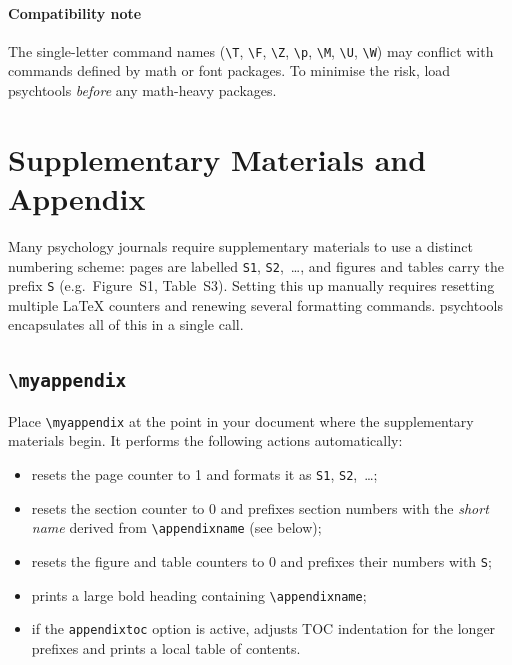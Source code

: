 \documentclass[a4paper,11pt]{article}
\makeatletter
\newcommand{\pkg}[1]{\textsf{#1}}
\newcommand{\cmd}[1]{\texttt{\textbackslash #1}}
\newcommand{\opt}[1]{\texttt{#1}}
\newcommand{\icmd}[1]{\cmd{#1}\index{#1@\texttt{\textbackslash #1}}}
\makeatother
\begin{document}
\paragraph{Compatibility note}
\label{sec:compat}
The single-letter command names (\cmd{T}, \cmd{F}, \cmd{Z}, \cmd{p},
\cmd{M}, \cmd{U}, \cmd{W}) may conflict with commands defined by math
or font packages.  To minimise the risk, load \pkg{psychtools}
\emph{before} any math-heavy packages.

\section{Supplementary Materials and Appendix}
\label{sec:appendix}

Many psychology journals require supplementary materials to use a
distinct numbering scheme: pages are labelled \texttt{S1},
\texttt{S2},~\ldots, and figures and tables carry the prefix
\texttt{S} (e.g.\ Figure~S1, Table~S3).  Setting this up manually
requires resetting multiple \LaTeX{} counters and renewing several
formatting commands.  \pkg{psychtools} encapsulates all of this in a
single call.

\subsection{\icmd{myappendix}}

Place \cmd{myappendix} at the point in your document where the
supplementary materials begin. It performs the following actions
automatically:

\begin{itemize}
  \item resets the page counter to 1 and formats it as \texttt{S1},
        \texttt{S2},~\ldots;
  \item resets the section counter to 0 and prefixes section numbers
        with the \emph{short name} derived from \cmd{appendixname}
        (see below);
  \item resets the figure and table counters to 0 and prefixes their
        numbers with \texttt{S};
  \item prints a large bold heading containing \cmd{appendixname};
  \item if the \opt{appendixtoc} option is active, adjusts TOC
        indentation for the longer prefixes and prints a local table
        of contents.
\end{itemize}
\end{document}
